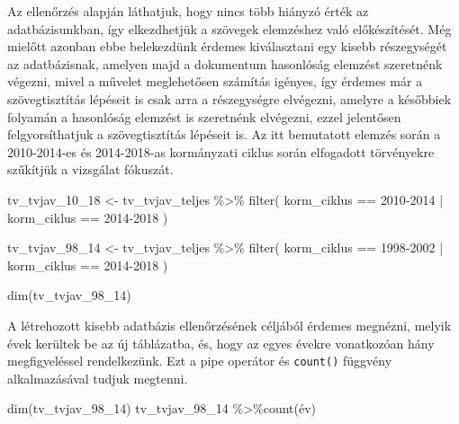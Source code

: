 \documentclass[
]{book}
\newenvironment{Shaded}{\begin{snugshade}}{\end{snugshade}}
\newcommand{\FunctionTok}[1]{\textcolor[rgb]{0.00,0.00,0.00}{#1}}
\newcommand{\NormalTok}[1]{#1}
\newcommand{\OtherTok}[1]{\textcolor[rgb]{0.56,0.35,0.01}{#1}}
\newcommand{\SpecialCharTok}[1]{\textcolor[rgb]{0.00,0.00,0.00}{#1}}
\newcommand{\StringTok}[1]{\textcolor[rgb]{0.31,0.60,0.02}{#1}}
\begin{document}
Az ellenőrzés alapján láthatjuk, hogy nincs több hiányzó érték az
adatbázisunkban, így elkezdhetjük a szövegek elemzéshez való
előkészítését. Még mielőtt azonban ebbe belekezdünk érdemes kiválasztani
egy kisebb részegységét az adatbázisnak, amelyen majd a dokumentum
hasonlóság elemzést szeretnénk végezni, mivel a művelet meglehetősen
számítás igényes, így érdemes már a szövegtisztítás lépéseit is csak
arra a részegységre elvégezni, amelyre a későbbiek folyamán a hasonlóság
elemzést is szeretnénk elvégezni, ezzel jelentősen felgyorsíthatjuk a
szövegtisztítás lépéseit is. Az itt bemutatott elemzés során a
2010-2014-es és 2014-2018-as kormányzati ciklus során elfogadott
törvényekre szűkítjük a vizsgálat fókuszát.

\begin{Shaded}
\begin{Highlighting}[]
\NormalTok{tv\_tvjav\_10\_18 }\OtherTok{\textless{}{-}}\NormalTok{ tv\_tvjav\_teljes }\SpecialCharTok{\%\textgreater{}\%} 
  \FunctionTok{filter}\NormalTok{(}
\NormalTok{    korm\_ciklus }\SpecialCharTok{==} \StringTok{\textquotesingle{}2010{-}2014\textquotesingle{}} \SpecialCharTok{|}\NormalTok{ korm\_ciklus }\SpecialCharTok{==} \StringTok{\textquotesingle{}2014{-}2018\textquotesingle{}}
\NormalTok{  )}
\end{Highlighting}
\end{Shaded}

\begin{Shaded}
\begin{Highlighting}[]
\NormalTok{tv\_tvjav\_98\_14 }\OtherTok{\textless{}{-}}\NormalTok{ tv\_tvjav\_teljes }\SpecialCharTok{\%\textgreater{}\%} 
  \FunctionTok{filter}\NormalTok{(}
\NormalTok{    korm\_ciklus }\SpecialCharTok{==} \StringTok{\textquotesingle{}1998{-}2002\textquotesingle{}} \SpecialCharTok{|}\NormalTok{ korm\_ciklus }\SpecialCharTok{==} \StringTok{\textquotesingle{}2014{-}2018\textquotesingle{}}
\NormalTok{  )}

\FunctionTok{dim}\NormalTok{(tv\_tvjav\_98\_14)}
\end{Highlighting}
\end{Shaded}

A létrehozott kisebb adatbázis ellenőrzésének céljából érdemes megnézni,
melyik évek kerültek be az új táblázatba, és, hogy az egyes évekre
vonatkozóan hány megfigyeléssel rendelkezünk. Ezt a pipe operátor és
\texttt{count()} függvény alkalmazásával tudjuk megtenni.

\begin{Shaded}
\begin{Highlighting}[]
\FunctionTok{dim}\NormalTok{(tv\_tvjav\_98\_14)}
\NormalTok{tv\_tvjav\_98\_14 }\SpecialCharTok{\%\textgreater{}\%}\FunctionTok{count}\NormalTok{(év)}
\end{Highlighting}
\end{Shaded}
\end{document}
